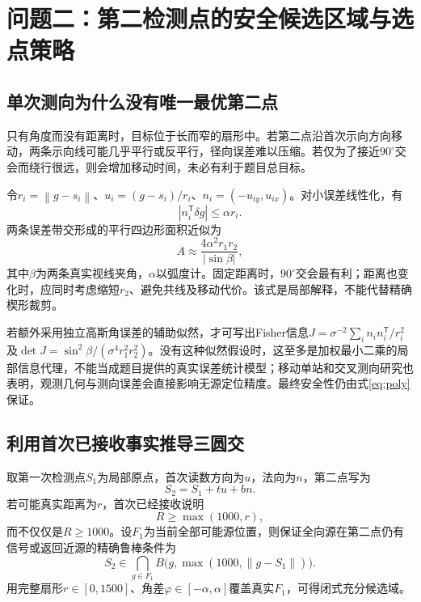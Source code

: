 \documentclass[UTF8,fontset=fandol,a4paper,zihao=-4]{ctexart}
\newcommand{\norm}[1]{\left\lVert#1\right\rVert}
\begin{document}
\section{问题二：第二检测点的安全候选区域与选点策略}
\subsection{单次测向为什么没有唯一最优第二点}
只有角度而没有距离时，目标位于长而窄的扇形中。若第二点沿首次示向方向移动，两条示向线可能几乎平行或反平行，径向误差难以压缩。若仅为了接近$90^\circ$交会而绕行很远，则会增加移动时间，未必有利于题目总目标。

令$r_i=\norm{g-s_i}$、$u_i=(g-s_i)/r_i$、$n_i=(-u_{iy},u_{ix})$。对小误差线性化，有
\begin{equation}\label{eq:strip}
|n_i^\mathsf T\delta g|\le\alpha r_i.
\end{equation}
两条误差带交形成的平行四边形面积近似为
\begin{equation}\label{eq:area}
A\approx\frac{4\alpha^2r_1r_2}{|\sin\beta|},
\end{equation}
其中$\beta$为两条真实视线夹角，$\alpha$以弧度计。固定距离时，$90^\circ$交会最有利；距离也变化时，应同时考虑缩短$r_2$、避免共线及移动代价。该式是局部解释，不能代替精确楔形裁剪。

若额外采用独立高斯角误差的辅助似然，才可写出Fisher信息$J=\sigma^{-2}\sum_i n_in_i^\mathsf T/r_i^2$及$\det J=\sin^2\beta/(\sigma^4r_1^2r_2^2)$。没有这种似然假设时，这至多是加权最小二乘的局部信息代理，不能当成题目提供的真实误差统计模型；移动单站和交叉测向研究也表明，观测几何与测向误差会直接影响无源定位精度\cite{qin,li}。最终安全性仍由式\eqref{eq:poly}保证。

\subsection{利用首次已接收事实推导三圆交}
取第一次检测点$S_1$为局部原点，首次读数方向为$u$，法向为$n$，第二点写为
\begin{equation}S_2=S_1+tu+bn.\end{equation}
若可能真实距离为$r$，首次已经接收说明
\begin{equation}R\ge\max(1000,r),\end{equation}
而不仅仅是$R\ge1000$。设$F_1$为当前全部可能源位置，则保证全向源在第二点仍有信号或返回近源的精确鲁棒条件为
\begin{equation}\label{eq:receive}
S_2\in\bigcap_{g\in F_1} B\bigl(g,\max(1000,\norm{g-S_1})\bigr).
\end{equation}
用完整扇形$r\in[0,1500]$、角差$\varphi\in[-\alpha,\alpha]$覆盖真实$F_1$，可得闭式充分候选域。
\end{document}
